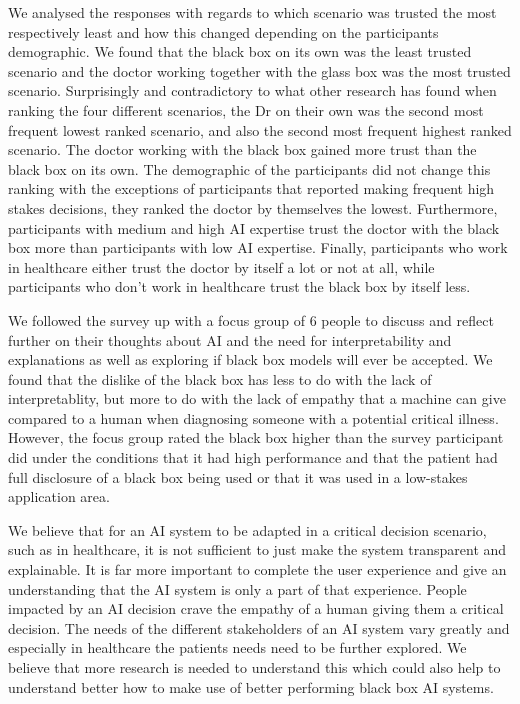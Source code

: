 \documentclass[manuscript,screen,review]{acmart}
\begin{document}
We analysed the responses with regards to which scenario was trusted the most respectively least and how this changed depending on the participants demographic. We found that the black box on its own was the least trusted scenario and the doctor working together with the glass box was the most trusted scenario. Surprisingly and contradictory to what other research has found when ranking the four different scenarios, the Dr on their own was the second most frequent lowest ranked scenario, and also the second most frequent highest ranked scenario. The doctor working with the black box gained  more trust than the black box on its own. The demographic of the participants did not change this ranking with the exceptions of participants that reported making frequent high stakes decisions, they ranked the doctor by themselves the lowest. Furthermore, participants with medium and high AI expertise trust the doctor with the black box more than participants with low AI expertise. Finally, participants who work in healthcare either trust the doctor by itself a lot or not at all, while participants who don’t work in healthcare trust the black box by itself less.

We followed the survey up with a focus group of 6 people to discuss and reflect further on their thoughts about AI and the need for interpretability and explanations as well as exploring if black box models will ever be accepted. We found that the dislike of the black box has less to do with the lack of interpretablity, but more to do with the lack of empathy that a machine can give compared to a human when diagnosing someone with a potential critical illness. However, the focus group rated the black box higher than the survey participant did under the conditions that it had high performance and that the patient had full disclosure of a black box being used or that it was used in a low-stakes application area.


We believe that for an AI system to be adapted in a critical decision scenario, such as in healthcare, it is not sufficient to just make the system transparent and explainable. It is far more important to complete the user experience and give an understanding that the AI system is only a part of that experience. People impacted by an AI decision crave the empathy of a human giving them a critical decision. The needs of the different stakeholders of an AI system vary greatly and especially in healthcare the patients needs need to be further explored. We believe that more research is needed to understand this which could also help to understand better how to make use of better performing black box AI systems.
\end{document}
